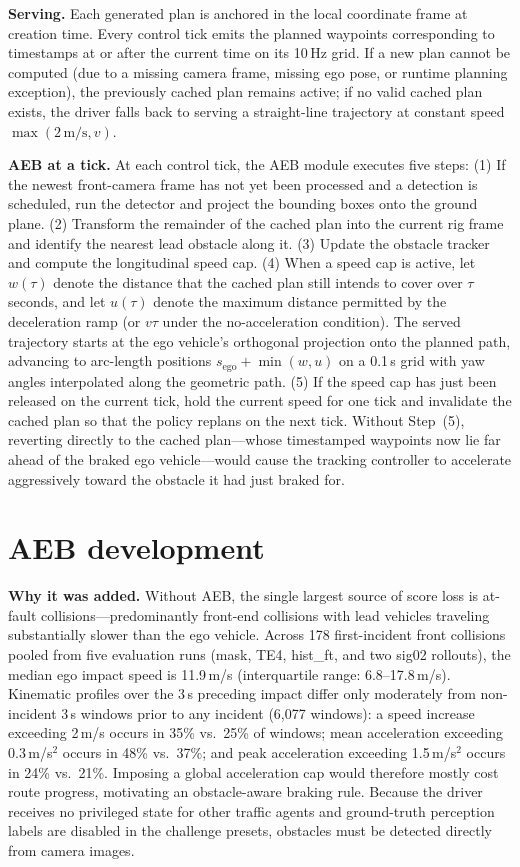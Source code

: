 \textbf{Serving.} Each generated plan is anchored in the local coordinate frame at creation time. Every control tick emits the planned waypoints corresponding to timestamps at or after the current time on its 10\,Hz grid. If a new plan cannot be computed (due to a missing camera frame, missing ego pose, or runtime planning exception), the previously cached plan remains active; if no valid cached plan exists, the driver falls back to serving a straight-line trajectory at constant speed $\max(2\,\mathrm{m/s},v)$.

\textbf{AEB at a tick.} At each control tick, the AEB module executes five steps: (1) If the newest front-camera frame has not yet been processed and a detection is scheduled, run the detector and project the bounding boxes onto the ground plane. (2) Transform the remainder of the cached plan into the current rig frame and identify the nearest lead obstacle along it. (3) Update the obstacle tracker and compute the longitudinal speed cap. (4) When a speed cap is active, let $w(\tau)$ denote the distance that the cached plan still intends to cover over $\tau$ seconds, and let $u(\tau)$ denote the maximum distance permitted by the deceleration ramp (or $v\tau$ under the no-acceleration condition). The served trajectory starts at the ego vehicle's orthogonal projection onto the planned path, advancing to arc-length positions $s_\mathrm{ego}+\min(w,u)$ on a 0.1\,s grid with yaw angles interpolated along the geometric path. (5) If the speed cap has just been released on the current tick, hold the current speed for one tick and invalidate the cached plan so that the policy replans on the next tick. Without Step~(5), reverting directly to the cached plan---whose timestamped waypoints now lie far ahead of the braked ego vehicle---would cause the tracking controller to accelerate aggressively toward the obstacle it had just braked for.

\FloatBarrier
\section{AEB development}
\label{app:aeb}
\textbf{Why it was added.} Without AEB, the single largest source of score loss is at-fault collisions---predominantly front-end collisions with lead vehicles traveling substantially slower than the ego vehicle. Across 178 first-incident front collisions pooled from five evaluation runs (mask, TE4, hist\_ft, and two sig02 rollouts), the median ego impact speed is 11.9\,m/s (interquartile range: 6.8--17.8\,m/s). Kinematic profiles over the 3\,s preceding impact differ only moderately from non-incident 3\,s windows prior to any incident (6{,}077 windows): a speed increase exceeding 2\,m/s occurs in 35\% vs.\ 25\% of windows; mean acceleration exceeding 0.3\,m/s$^2$ occurs in 48\% vs.\ 37\%; and peak acceleration exceeding 1.5\,m/s$^2$ occurs in 24\% vs.\ 21\%. Imposing a global acceleration cap would therefore mostly cost route progress, motivating an obstacle-aware braking rule. Because the driver receives no privileged state for other traffic agents and ground-truth perception labels are disabled in the challenge presets, obstacles must be detected directly from camera images.

